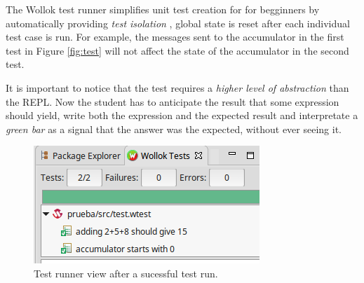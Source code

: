 The Wollok test runner simplifies unit test creation for for begginners by automatically providing \emph{test isolation} \cite{martin2008cleanCode},
\ie global state is reset after each individual test case is run.
For example, the messages sent to the accumulator in the first test in Figure \ref{fig:test} will not affect the state of the accumulator in the second test.

It is important to notice that the test requires a \emph{higher level of abstraction} than the REPL.
Now the student has to anticipate the result that some expression should yield, write both the expression and the expected result 
and interpretate a \emph{green bar} as a signal that the answer was the expected, without ever seeing it.

\begin{figure}[ht]
\vspace{-2mm}
\centering
\includegraphics[scale=0.6]{images/testRunner.png}
\vspace{-2mm}
\caption{Test runner view after a sucessful test run.}
\label{fig:testRunner.png}
\vspace{-4mm}
\end{figure}

